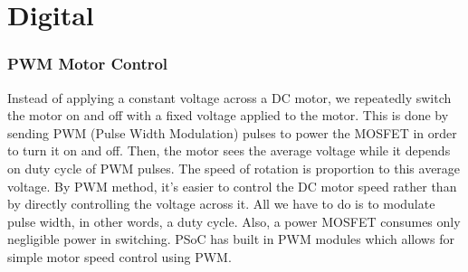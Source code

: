 \section{Digital}
\subsubsection*{PWM Motor Control} 
Instead of applying a constant voltage across a DC motor, we repeatedly switch the motor on and off with a fixed voltage applied to the motor. This is done by sending PWM (Pulse Width Modulation) pulses to power the MOSFET in order to turn it on and off. Then, the motor sees the average voltage while it depends on duty cycle of PWM pulses. The speed of rotation is proportion to this average voltage. By PWM method, it’s easier to control the DC motor speed rather than by directly controlling the voltage across it. All we have to do is to modulate pulse width, in other words, a duty cycle. Also, a power MOSFET consumes only negligible power in switching. PSoC has built in PWM modules which allows for simple motor speed control using PWM.

